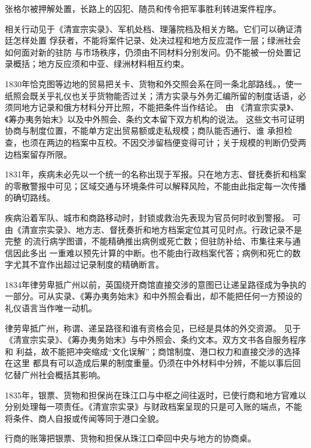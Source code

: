 张格尔被押解处置，长路上的囚犯、随员和传令把军事胜利转进案件程序。

相关行动见于《清宣宗实录》、军机处档、理藩院档及相关方略。它们可以确证清廷怎样处置
俘获者，不能将案件记录、处决过程和地方反应混作一层；绿洲社会如何面对新的驻防
与市场秩序，仍须由不同材料分别发问。仍不能被一份处置记录概括；地方反应须和中亚、绿洲材料相互约束。

1830年恰克图等边地的贸易把关卡、货物和外交照会系在同一条北部路线。，使一纸照会既关乎礼仪也关乎货物能否过关；清方实录与外务汇编所留的制度话语，必须同地方记录和俄方材料分开比照，不能把条件当作结论。
由
《清宣宗实录》、《筹办夷务始末》以及中外照会、条约文本留下双方机构的说法。
这些文书可证明协商与制度位置，不能单方定出贸易额或走私规模；商队能否通行、谁
承担检查，也须在两边的档案中互校。不因交涉留档便变得可计；关于规模的判断仍受两边档案留存所限。

1831年，疾病未必先以一个统一的名称出现于军报。只在地方志、督抚奏折和档案的零散警报中可见；区域交通与环境条件可以解释风险，不能由此指定每一次传播的确切路线。

疾病沿着军队、城市和商路移动时，封锁或救治先表现为官员何时收到警报。
可由《清宣宗实录》、地方志、督抚奏折和地方档案定位其可见时点。行政记录不是完整
的流行病学图谱，不能精确推出病例或死亡数；但驻防补给、市集往来与通信因此多出
一重难以预先计算的中断。也不能由行政档案代答；病例和死亡的数字尤其不宜作出超过记录制度的精确断言。

1834年律劳卑抵广州以前，英国绕开商馆直接交涉的意图已让递呈路径成为争执的一部分。可从实录、《筹办夷务始末》和中外照会看出，却不能把任何一方预设的礼仪语言当作唯一动机。

律劳卑抵广州，称谓、递呈路径和谁有资格会见，已经是具体的外交资源。
见于
《清宣宗实录》、《筹办夷务始末》与中外照会、条约文本。双方文书各自服务程序和
利益，故不能把冲突缩成“文化误解”；商馆制度、港口权力和直接交涉的选择在这里
都具有可以造成后果的制度重量。仍须在中外材料中分辨，不能以事后回忆替广州社会概括其影响。

1835年，银票、货物和担保尚在珠江口与中枢之间往返时，已使行商和地方官难以分别处理每一项责任。《清宣宗实录》与财政档案呈现的只是可入账的端点，不能将条件、商人自报或传闻等同于港口全貌。

行商的账簿把银票、货物和担保从珠江口牵回中央与地方的协商桌。


